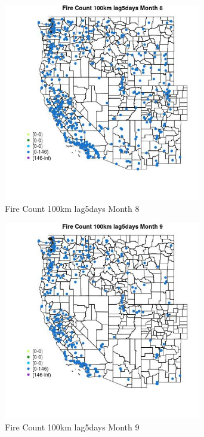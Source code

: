 \begin{figure} 
\centering  
\includegraphics[width=0.77\textwidth]{Code_Outputs/Report_ML_input_PM25_Step4_part_e_de_duplicated_aves_compiled_2019-05-18wNAs_MapObsMo8Fire_Count_100km_lag5days.jpg} 
\caption{\label{fig:Report_ML_input_PM25_Step4_part_e_de_duplicated_aves_compiled_2019-05-18wNAsMapObsMo8Fire_Count_100km_lag5days}Fire Count 100km lag5days Month 8} 
\end{figure} 
 

\begin{figure} 
\centering  
\includegraphics[width=0.77\textwidth]{Code_Outputs/Report_ML_input_PM25_Step4_part_e_de_duplicated_aves_compiled_2019-05-18wNAs_MapObsMo9Fire_Count_100km_lag5days.jpg} 
\caption{\label{fig:Report_ML_input_PM25_Step4_part_e_de_duplicated_aves_compiled_2019-05-18wNAsMapObsMo9Fire_Count_100km_lag5days}Fire Count 100km lag5days Month 9} 
\end{figure} 
 

